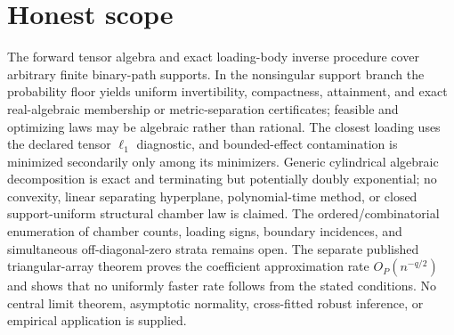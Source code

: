\documentclass{article}
\begin{document}
\section{Honest scope}

The forward tensor algebra and exact loading-body inverse procedure cover arbitrary finite binary-path supports. In the nonsingular support branch the probability floor yields uniform invertibility, compactness, attainment, and exact real-algebraic membership or metric-separation certificates; feasible and optimizing laws may be algebraic rather than rational. The closest loading uses the declared tensor \(\ell_1\) diagnostic, and bounded-effect contamination is minimized secondarily only among its minimizers. Generic cylindrical algebraic decomposition is exact and terminating but potentially doubly exponential; no convexity, linear separating hyperplane, polynomial-time method, or closed support-uniform structural chamber law is claimed. The ordered/combinatorial enumeration of chamber counts, loading signs, boundary incidences, and simultaneous off-diagonal-zero strata remains open. The separate published triangular-array theorem proves the coefficient approximation rate \(O_P(n^{-q/2})\) and shows that no uniformly faster rate follows from the stated conditions. No central limit theorem, asymptotic normality, cross-fitted robust inference, or empirical application is supplied.
\end{document}
